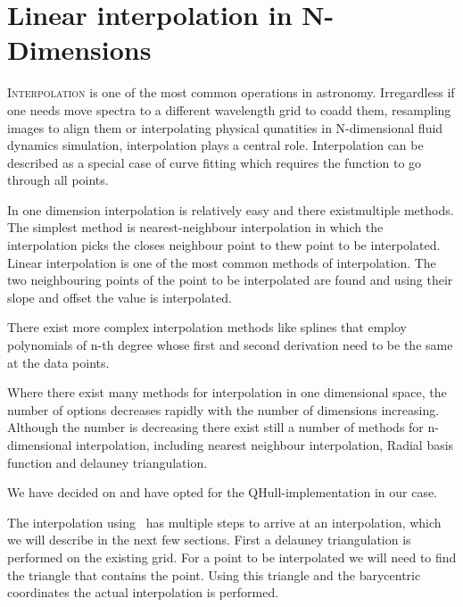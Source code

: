 \chapter{Linear interpolation in N-Dimensions}
\label{chap:four}

\lettrine[lines=4]{I}{nterpolation} is one of the most common operations in astronomy. Irregardless if one needs move spectra to a different wavelength grid to coadd them, resampling images to align them or interpolating physical qunatities in N-dimensional fluid dynamics simulation, interpolation plays a central role.
Interpolation can be described as a special case of curve fitting which requires the function to go through all points. 

In one dimension interpolation is relatively easy and there existmultiple methods. The simplest method is nearest-neighbour interpolation in which the interpolation picks the closes neighbour point to thew point to be interpolated.  
Linear interpolation is one of the most common methods of interpolation. The two neighbouring points of the point to be interpolated are found and using their slope and offset the value is interpolated.

There exist more complex interpolation methods like splines that employ polynomials of n-th degree whose first and second derivation need to be the same at the data points. 

Where there exist many methods for interpolation in one dimensional space, the number of options decreases rapidly with the number of dimensions increasing. 
Although the number is decreasing there exist still a number of methods for n-dimensional interpolation, including nearest neighbour interpolation, Radial basis function and delauney triangulation.

We have decided on \deltri and have opted for the QHull-implementation  \citep{Barber96thequickhull} in our case.

The interpolation using \deltri\ has multiple steps to arrive at an  interpolation, which we will describe in the next few sections. First a delauney triangulation is performed on the existing grid. For a point to be interpolated we will need to find the triangle that contains the point. Using this triangle and the barycentric coordinates the actual interpolation is performed. 






